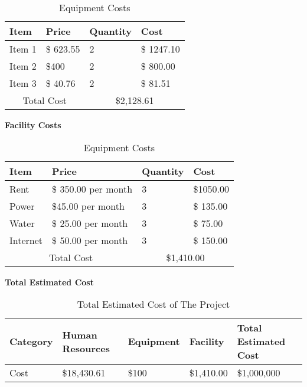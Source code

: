 \begin{table}[h]
    \begin{tabular}{||m{}|m{}|m{}|m{}||}
        \hline
        Item & Price & Quantity & Cost\\
        \hline
        Item 1 &  \$ 623.55 & 2 & \$ 1247.10\\ 
        \hline
        Item 2 & \$400 & 2 & \$ 800.00 \\
        \hline
        Item 3 & \$ 40.76 & 2 & \$ 81.51\\ 
        \hline
        \multicolumn{2}{||c|}{Total Cost} & \multicolumn{2}{c||}{\$2,128.61}\\
        \hline
       \end{tabular}
       \caption {Equipment Costs}
       \label{table:4}
\end{table}
\textbf{Facility Costs}\\
\begin{table}[h]
    \begin{tabular}{||m{}|m{}|m{}|m{}||}
        \hline
        Item & Price & Quantity & Cost\\
        \hline
        Rent &  \$ 350.00 per month & 3 & \$1050.00\\ 
        \hline
        Power & \$45.00 per month & 3 & \$ 135.00 \\
        \hline
        Water & \$ 25.00 per month & 3 & \$ 75.00\\ 
        \hline
        Internet& \$ 50.00 per month & 3 & \$ 150.00\\ 
        \hline
        \multicolumn{2}{||c|}{Total Cost} & \multicolumn{2}{c||}{\$1,410.00}\\
        \hline
       \end{tabular}
       \caption {Equipment Costs}
       \label{table:5}
\end{table}
\textbf{Total Estimated Cost}\\
\begin{table}[h]
    \begin{tabular}{||m{}|m{}|m{}|m{}|m{}||}
        \hline
        Category & Human Resources & Equipment & Facility & Total Estimated Cost\\
        \hline
        Cost & \$18,430.61 & \$100 & \$1,410.00 & \$1,000,000\\
        \hline
    \end{tabular}
    \caption {Total Estimated Cost of The Project}
       \label{table:6}
\end{table}